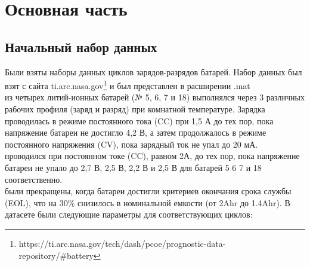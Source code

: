 \documentclass[russian,english,18pt,a4paper,reqno,dviphfm]{article}
\begin{document}
\section{Основная часть}
\subsection{Начальный набор данных}
Были взяты наборы данных циклов зарядов-разрядов батарей.
		Набор данных был взят с сайта ti.arc.nasa.gov\footnote{https://ti.arc.nasa.gov/tech/dash/pcoe/prognostic-data-repository/\#battery} и был представлен в расширении .mat 
		\\
		 из четырех литий-ионных батарей (№ 5, 6, 7 и 18) выполнялся через 3 различных рабочих профиля (заряд и разряд) при комнатной температуре. Зарядка проводилась в режиме постоянного тока (CC) при 1,5 А до тех пор, пока напряжение батареи не достигло 4,2 В, а затем продолжалось в режиме постоянного напряжения (CV), пока зарядный ток не упал до 20 мА. 
		\\
		 проводился при постоянном токе (CC), равном 2А, до тех пор, пока напряжение батареи не упало до 2,7 В, 2,5 В, 2,2 В и 2,5 В для батарей 5 6 7 и 18 соответственно. 
		\\
		 были прекращены, когда батареи достигли критериев окончания срока службы (EOL), что на 30\% снизилось в номинальной емкости (от 2Ahr до 1.4Ahr).
		В датасете были следующие параметры для соответствующих циклов: 
\end{document}
